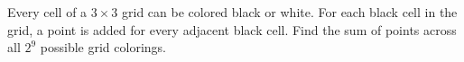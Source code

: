 Every cell of a $3\times 3$ grid can be colored black or white. For each black cell in the grid, a point is added for every adjacent black cell. Find the sum of points across all $2^9$ possible grid colorings.
